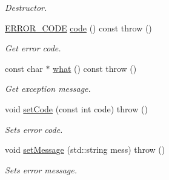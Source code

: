 \begin{DoxyCompactItemize}
\begin{DoxyCompactList}\small\item\em Destructor. \item\end{DoxyCompactList}\item 
\hyperlink{namespaceChEngn_a347ab4e4a29f725ed0253d8311c82233}{ERROR\_\-CODE} \hyperlink{classChEngn_1_1Exception_aefcd64f7d56140d92c29bb2951da8e05}{code} () const   throw ()
\begin{DoxyCompactList}\small\item\em Get error code. \item\end{DoxyCompactList}\item 
const char $\ast$ \hyperlink{classChEngn_1_1Exception_ad503beb2dfcf1db3d8b16128aa5f0bcd}{what} () const   throw ()
\begin{DoxyCompactList}\small\item\em Get exception message. \item\end{DoxyCompactList}\item 
void \hyperlink{classChEngn_1_1Exception_a80e1913344d7d230cbbbab621bad8d28}{setCode} (const int code)  throw ()
\begin{DoxyCompactList}\small\item\em Sets error code. \item\end{DoxyCompactList}\item 
void \hyperlink{classChEngn_1_1Exception_abb512c199834ae75a74e9674cce6090b}{setMessage} (std::string mess)  throw ()
\begin{DoxyCompactList}\small\item\em Sets error message. \item\end{DoxyCompactList}\end{DoxyCompactItemize}


